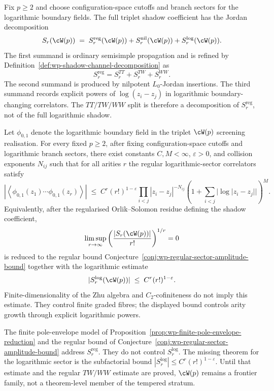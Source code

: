 \begin{definition}
\label{def:wp-reg-nil-log-shadow-decomposition}
Fix $p \ge 2$ and choose configuration-space cutoffs and branch sectors
for the logarithmic boundary fields. The full triplet shadow coefficient
has the Jordan decomposition
\[
 S_r(\cW(p))
 \;=\;
 S_r^{\mathrm{reg}}(\cW(p))
 + S_r^{\mathrm{nil}}(\cW(p))
 + S_r^{\log}(\cW(p)).
\]
The first summand is ordinary semisimple propagation and is refined by
Definition~\ref{def:wp-shadow-channel-decomposition} as
\[
 S_r^{\mathrm{reg}}
 = S_r^{TT}+S_r^{TW}+S_r^{WW}.
\]
The second summand is produced by nilpotent $L_0$-Jordan insertions.
The third summand records explicit powers of
$\log(z_i-z_j)$ in logarithmic boundary-changing correlators. The
$TT/TW/WW$ split is therefore a decomposition of
$S_r^{\mathrm{reg}}$, not of the full logarithmic shadow.
\end{definition}

\begin{conjecture}
\label{conj:wp-logarithmic-boundary-amplitude-bound}
Let $\phi_{0,1}$ denote the logarithmic boundary field in the
triplet $\cW(p)$ screening realisation. For every fixed $p \ge 2$,
after fixing configuration-space cutoffs and logarithmic branch sectors,
there exist constants $C,M < \infty$, $\varepsilon>0$, and collision
exponents $N_{ij}$ such that for all arities $r$ the regular
logarithmic-sector correlators satisfy
\[
 \left|
 \left\langle
 \phi_{0,1}(z_1)\cdots \phi_{0,1}(z_r)
 \right\rangle
 \right|
 \;\le\;
 C^r (r!)^{1-\varepsilon}
 \prod_{i<j}|z_i-z_j|^{-N_{ij}}
 \left(1+\sum_{i<j}|\log |z_i-z_j||\right)^M .
\]
Equivalently, after the regularised Orlik--Solomon residue defining the
shadow coefficient,
\[
 \limsup_{r\to\infty}
 \left(\frac{|S_r(\cW(p))|}{r!}\right)^{1/r}=0
\]
is reduced to the regular bound
Conjecture~\ref{conj:wp-regular-sector-amplitude-bound} together with
the logarithmic estimate
\[
 |S_r^{\log}(\cW(p))|
 \;\le\;
 C^r(r!)^{1-\varepsilon}.
\]
Finite-dimensionality of the Zhu algebra and $C_2$-cofiniteness do not
imply this estimate. They control finite graded fibres; the displayed
bound controls arity growth through explicit logarithmic powers.
\end{conjecture}

\begin{remark}
The finite pole-envelope model of
Proposition~\ref{prop:wp-finite-pole-envelope-reduction} and the
regular bound of Conjecture~\ref{conj:wp-regular-sector-amplitude-bound}
address $S_r^{\mathrm{reg}}$. They do not control
$S_r^{\log}$. The missing theorem for the logarithmic sector is the
subfactorial bound
$|S_r^{\log}|\le C^r(r!)^{1-\varepsilon}$. Until that estimate and the
regular $TW/WW$ estimate are proved, $\cW(p)$ remains a frontier family,
not a theorem-level member of the tempered stratum.
\end{remark}


